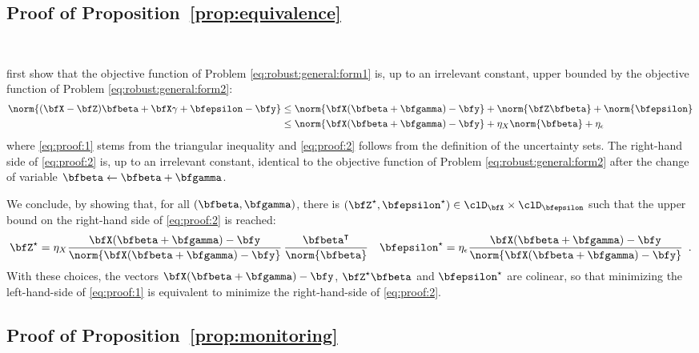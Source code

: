\subsection{Proof of Proposition~\ref{prop:equivalence}}~\label{sec:proof:prop:equivalence}

first show that the objective function of Problem
 \eqref{eq:robust:general:form1} is, up to an irrelevant constant, upper bounded
 by the objective function of Problem \eqref{eq:robust:general:form2}:
 \begin{align}
   \norm{(\bfX - \bfZ) \bfbeta + \bfX \gamma + \bfepsilon - \bfy}
   & \leq
   \norm{\bfX (\bfbeta + \bfgamma) - \bfy} +
   \norm{\bfZ \bfbeta}   +
   \norm{\bfepsilon}  \label{eq:proof:1} \\
   & \leq
   \norm{\bfX (\bfbeta + \bfgamma) - \bfy} +
   \eta_X  \norm{\bfbeta} + \eta_\epsilon \label{eq:proof:2}
 \end{align}   
 where \eqref{eq:proof:1} stems from the triangular inequality and
 \eqref{eq:proof:2} follows from the definition of the uncertainty sets.
 The right-hand side of \eqref{eq:proof:2} is, up to an irrelevant constant,
 identical to the objective function of Problem \eqref{eq:robust:general:form2}
 after the change of variable
 $\bfbeta\leftarrow\bfbeta + \bfgamma$.

 We conclude, by showing that, for all $(\bfbeta,\bfgamma)$, there is
 $(\bfZ^\star,\bfepsilon^\star)\in\clD_{\bfX}\times\clD_{\bfepsilon}$ such that
 the upper bound on the right-hand side of \eqref{eq:proof:2} is reached:
 \begin{align*}
   & \bfZ^\star = \eta_X \frac{\bfX (\bfbeta + \bfgamma) - \bfy}{\norm{\bfX (\bfbeta + \bfgamma) - \bfy}}
   \,\frac{\bfbeta^\intercal}{\norm{\bfbeta}}
   & \bfepsilon^\star =  \eta_\epsilon \frac{\bfX (\bfbeta + \bfgamma) - \bfy}{\norm{\bfX (\bfbeta + \bfgamma) - \bfy}}
   \enspace.
 \end{align*}   
 With these choices, the vectors $\bfX (\bfbeta + \bfgamma) - \bfy$,
 $\bfZ^\star\bfbeta$ and $\bfepsilon^\star$ are colinear, so that minimizing the
 left-hand-side of \eqref{eq:proof:1} is equivalent to minimize the
 right-hand-side of \eqref{eq:proof:2}.
 
 
\subsection{Proof of Proposition~\ref{prop:monitoring}}~\label{sec:proof:prop:monitoring}

